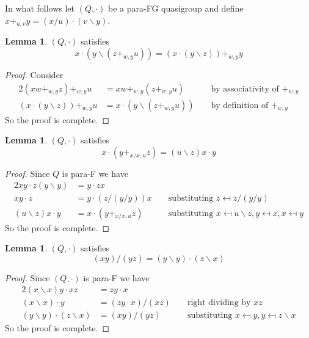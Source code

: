 \documentclass[12pt]{report}
\theoremstyle{definition}
\newtheorem{lem}[thm]{Lemma}
\newcommand{\ldv}{\backslash}       %
\newcommand{\rdv}{/}                %
\begin{document}
In what follows let $(Q, \cdot)$ be a para-FG quasigroup and define
  $x +_{u, v} y = (x\rdv u) \cdot (v\ldv y)$.

\begin{lem}\label{lem-30}
  $(Q, \cdot)$ satisfies
  \[x\cdot (y\ldv (z +_{w, y} u)) = (x\cdot (y\ldv z)) +_{w, y} y\]
\end{lem}

\begin{proof}
  Consider
  \begin{alignat*}{2}
    (xw +_{w, y} z) +_{w, y} u &= xw +_{w, y} (z +_{w, y} u) &&\text{ by associativity of $+_{w, y}$}\\
    (x\cdot (y\ldv z)) +_{w, y} u &= x\cdot (y\ldv (z +_{w, y} u)) &&\text{ by definition of $+_{w, y}$}
  \end{alignat*}
  So the proof is complete.
\end{proof}

\begin{lem}\label{lem-33ii}
  $(Q, \cdot)$ satisfies
  \[x\cdot (y +_{x\rdv x, u} z) = (u\ldv z)x\cdot y\]
\end{lem}

\begin{proof}
  Since $Q$ is para-F we have
  \begin{alignat*}{2}
    xy\cdot z(y\ldv y) &= y\cdot zx\\
    xy\cdot z &= y\cdot (z\rdv(y\rdv y))x &&\text{ substituting $z\mapsfrom z\rdv(y\rdv y)$}\\
    (u\ldv z)x\cdot y &= x\cdot (y +_{x\rdv x, u} z) &&\text{ substituting
      $x\mapsfrom u\ldv z, y\mapsfrom x, x\mapsfrom y$}
  \end{alignat*}
  So the proof is complete.
\end{proof}

\begin{lem}\label{lem-34ii}
  $(Q, \cdot)$ satisfies
  \[(xy)\rdv (yz) = (y\ldv y)\cdot (z\ldv x)\]
\end{lem}

\begin{proof}
  Since $(Q, \cdot)$ is para-F we have
  \begin{alignat*}{2}
    (x\ldv x)y\cdot xz &= zy\cdot x &&\\
    (x\ldv x)\cdot y &= (zy\cdot x)\rdv (xz) &&\text{ right dividing by $xz$}\\
    (y\ldv y)\cdot (z\ldv x) &= (xy)\rdv(yz) &&\text{ substituting
      $x\mapsfrom y, y\mapsfrom z\ldv x$}
  \end{alignat*}
  So the proof is complete.
\end{proof}
\end{document}
